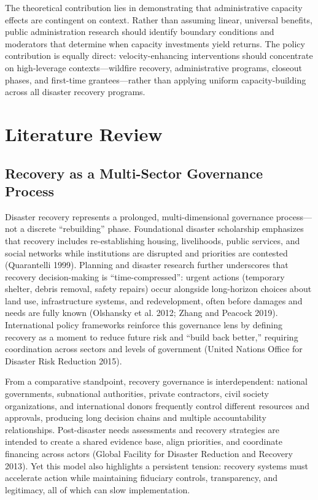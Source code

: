 \documentclass[
  12pt,
  letterpaper,
]{article}
\begin{document}
The theoretical contribution lies in demonstrating that administrative
capacity effects are contingent on context. Rather than assuming linear,
universal benefits, public administration research should identify
boundary conditions and moderators that determine when capacity
investments yield returns. The policy contribution is equally direct:
velocity-enhancing interventions should concentrate on high-leverage
contexts---wildfire recovery, administrative programs, closeout phases,
and first-time grantees---rather than applying uniform capacity-building
across all disaster recovery programs.

\section{Literature Review}\label{literature-review}

\subsection{Recovery as a Multi-Sector Governance
Process}\label{recovery-as-a-multi-sector-governance-process}

Disaster recovery represents a prolonged, multi-dimensional governance
process---not a discrete ``rebuilding'' phase. Foundational disaster
scholarship emphasizes that recovery includes re-establishing housing,
livelihoods, public services, and social networks while institutions are
disrupted and priorities are contested (Quarantelli 1999). Planning and
disaster research further underscores that recovery decision-making is
``time-compressed'': urgent actions (temporary shelter, debris removal,
safety repairs) occur alongside long-horizon choices about land use,
infrastructure systems, and redevelopment, often before damages and
needs are fully known (Olshansky et al. 2012; Zhang and Peacock 2019).
International policy frameworks reinforce this governance lens by
defining recovery as a moment to reduce future risk and ``build back
better,'' requiring coordination across sectors and levels of government
(United Nations Office for Disaster Risk Reduction 2015).

From a comparative standpoint, recovery governance is interdependent:
national governments, subnational authorities, private contractors,
civil society organizations, and international donors frequently control
different resources and approvals, producing long decision chains and
multiple accountability relationships. Post-disaster needs assessments
and recovery strategies are intended to create a shared evidence base,
align priorities, and coordinate financing across actors (Global
Facility for Disaster Reduction and Recovery 2013). Yet this model also
highlights a persistent tension: recovery systems must accelerate action
while maintaining fiduciary controls, transparency, and legitimacy, all
of which can slow implementation.
\end{document}
